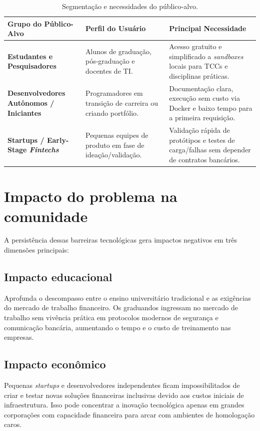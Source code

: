 \documentclass[
  12pt,
  openright,
  oneside,
  a4paper,
  brazilian
]{abntex2}
\begin{document}
\begin{table}[htbp]
\centering
\caption{Segmentação e necessidades do público-alvo.}
\label{tab:publico_alvo}
\begin{tabular}{|p{4.5cm}|p{5cm}|p{5cm}|}
\hline
\textbf{Grupo do Público-Alvo} & \textbf{Perfil do Usuário} & \textbf{Principal Necessidade} \\ \hline
\textbf{Estudantes e Pesquisadores} & Alunos de graduação, pós-graduação e docentes de TI. & Acesso gratuito e simplificado a \textit{sandboxes} locais para TCCs e disciplinas práticas. \\ \hline
\textbf{Desenvolvedores Autônomos / Iniciantes} & Programadores em transição de carreira ou criando portfólio. & Documentação clara, execução sem custo via Docker e baixo tempo para a primeira requisição. \\ \hline
\textbf{Startups / Early-Stage \textit{Fintechs}} & Pequenas equipes de produto em fase de ideação/validação. & Validação rápida de protótipos e testes de carga/falhas sem depender de contratos bancários. \\ \hline
\end{tabular}
\end{table}

\section{Impacto do problema na comunidade}
\label{sec:impacto_problema}

A persistência dessas barreiras tecnológicas gera impactos negativos em três dimensões principais:

\subsection{Impacto educacional}
Aprofunda o descompasso entre o ensino universitário tradicional e as exigências do mercado de trabalho financeiro. Os graduandos ingressam no mercado de trabalho sem vivência prática em protocolos modernos de segurança e comunicação bancária, aumentando o tempo e o custo de treinamento nas empresas.

\subsection{Impacto econômico}
Pequenas \textit{startups} e desenvolvedores independentes ficam impossibilitados de criar e testar novas soluções financeiras inclusivas devido aos custos iniciais de infraestrutura. Isso pode concentrar a inovação tecnológica apenas em grandes corporações com capacidade financeira para arcar com ambientes de homologação caros.
\end{document}
